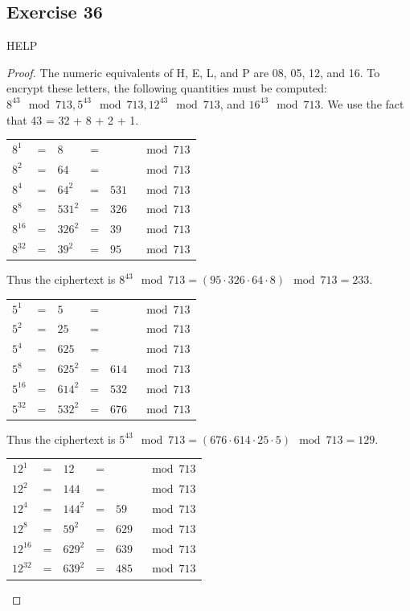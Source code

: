\documentclass[14pt]{extarticle}
\begin{document}
\subsection{Exercise 36}
HELP
\begin{proof}
        The numeric equivalents of H, E, L, and P are 08, 05, 12, and 16. To encrypt these letters, the following quantities
        must be computed: \(8^{43} \mod 713, 5^{43} \mod 713, 12^{43} \mod 713\), and \(16^{43} \mod 713\). We use the
        fact that 43 = 32 + 8 + 2 + 1.

        \begin{tabular}{lclcll}
                \(8^1\)    & = & \(8\)     & = & \(\)    & \(\mod 713\) \\
                \(8^2\)    & = & \(64\)    & = & \(\)    & \(\mod 713\) \\
                \(8^4\)    & = & \(64^2\)  & = & \(531\) & \(\mod 713\) \\
                \(8^8\)    & = & \(531^2\) & = & \(326\) & \(\mod 713\) \\
                \(8^{16}\) & = & \(326^2\) & = & \(39\)  & \(\mod 713\) \\
                \(8^{32}\) & = & \(39^2\)  & = & \(95\)  & \(\mod 713\)
        \end{tabular}

        Thus the ciphertext is \(8^{43} \mod 713 = (95 \cdot 326 \cdot 64 \cdot 8) \mod 713 = 233\).

        \begin{tabular}{lclcll}
                \(5^1\)    & = & \(5\)     & = & \(\)    & \(\mod 713\) \\
                \(5^2\)    & = & \(25\)    & = & \(\)    & \(\mod 713\) \\
                \(5^4\)    & = & \(625\)   & = & \(\)    & \(\mod 713\) \\
                \(5^8\)    & = & \(625^2\) & = & \(614\) & \(\mod 713\) \\
                \(5^{16}\) & = & \(614^2\) & = & \(532\) & \(\mod 713\) \\
                \(5^{32}\) & = & \(532^2\) & = & \(676\) & \(\mod 713\)
        \end{tabular}

        Thus the ciphertext is \(5^{43} \mod 713 = (676 \cdot 614 \cdot 25 \cdot 5) \mod 713 = 129\).

        \begin{tabular}{lclcll}
                \(12^1\)    & = & \(12\)    & = & \(\)    & \(\mod 713\) \\
                \(12^2\)    & = & \(144\)   & = & \(\)    & \(\mod 713\) \\
                \(12^4\)    & = & \(144^2\) & = & \(59\)  & \(\mod 713\) \\
                \(12^8\)    & = & \(59^2\)  & = & \(629\) & \(\mod 713\) \\
                \(12^{16}\) & = & \(629^2\) & = & \(639\) & \(\mod 713\) \\
                \(12^{32}\) & = & \(639^2\) & = & \(485\) & \(\mod 713\)
        \end{tabular}


\end{proof}
\end{document}

